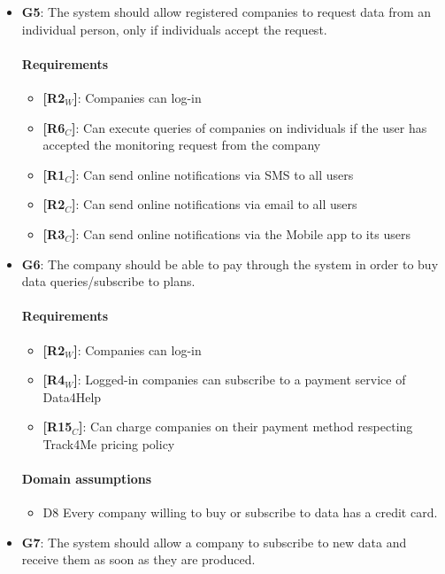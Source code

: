 \begin{itemize}
    \item \textbf{G5}: The system should allow registered companies to request data from an individual person, only if individuals accept the request.
    \paragraph{Requirements}
   \begin{itemize}
        \item \textbf{[R2$_W$]}: Companies can log-in
      \item \textbf{[R6$_C$]}: Can execute queries of companies on individuals if the user has accepted the monitoring request from the company
      \item \textbf{[R1$_C$]}: Can send online notifications via SMS to all users 
    \item \textbf{[R2$_C$]}: Can send online notifications via email to all users
    \item \textbf{[R3$_C$]}: Can send online notifications via the Mobile app to its users
   \end{itemize}
    
    \item \textbf{G6}: The company should be able to pay through the system in order to buy data queries/subscribe to plans.
    \paragraph{Requirements}
   \begin{itemize}
       \item \textbf{[R2$_W$]}: Companies can log-in
       \item \textbf{[R4$_W$]}: Logged-in companies can subscribe to a payment service of Data4Help
       \item \textbf{[R15$_C$]}: Can charge companies on their payment method respecting Track4Me pricing policy
   \end{itemize}
   \paragraph{Domain assumptions}
   \begin{itemize}
       \item  D8  Every company willing to buy or subscribe to data has a credit card.
   \end{itemize}
   
    \item \textbf{G7}: The system should allow a company to subscribe to new data and receive them as soon as they are produced.

\end{itemize}
